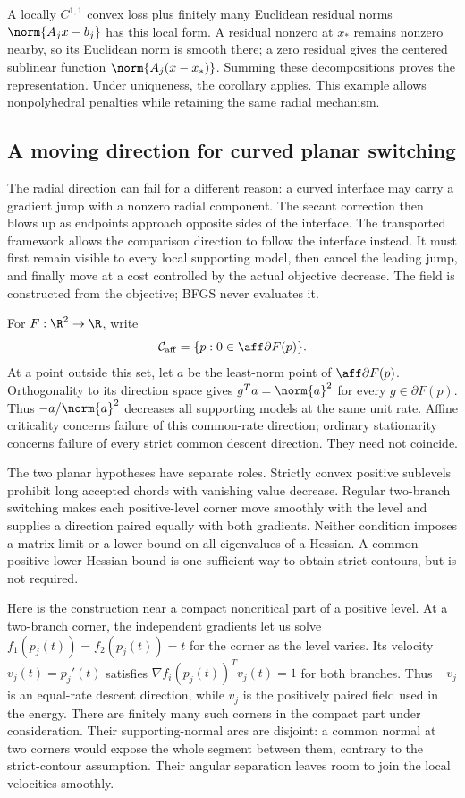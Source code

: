 A locally $C^{1,1}$ convex loss plus finitely many Euclidean
residual norms $\norm{A_jx-b_j}$ has this local form. A residual nonzero at
$x_*$ remains nonzero nearby, so its Euclidean norm is smooth there; a zero
residual gives the centered sublinear function $\norm{A_j(x-x_*)}$.
Summing these decompositions proves the representation. Under uniqueness,
the corollary applies. This example allows nonpolyhedral penalties while
retaining the same radial mechanism.

\subsection{A moving direction for curved planar switching}

The radial direction can fail for a different reason: a curved interface may
carry a gradient jump with a nonzero radial component. The secant correction
then blows up as endpoints approach opposite sides of the interface.
The transported framework allows the comparison direction to follow the
interface instead. It must first remain visible to every local supporting
model, then cancel the leading jump, and finally move at a cost controlled
by the actual objective decrease. The field is constructed from the
objective; BFGS never evaluates it.

For $F:\R^2\to\R$, write
\[
 \mathcal C_{\rm aff}=
 \{p:0\in\aff\partial F(p)\}.
\]
At a point outside this set, let $a$ be the least-norm point of
$\aff\partial F(p)$. Orthogonality to its direction space gives
$g^Ta=\norm{a}^2$ for every $g\in\partial F(p)$. Thus
$-a/\norm{a}^2$ decreases all supporting models at the same unit rate.
Affine criticality concerns failure of this common-rate direction;
ordinary stationarity concerns failure of every strict common descent
direction. They need not coincide.

The two planar hypotheses have separate roles. Strictly convex positive
sublevels prohibit long accepted chords with vanishing value decrease.
Regular two-branch switching makes each positive-level corner move smoothly
with the level and supplies a direction paired equally with both gradients.
Neither condition imposes a matrix limit or a lower bound on all eigenvalues
of a Hessian. A common positive lower Hessian bound is one sufficient way
to obtain strict contours, but is not required.

Here is the construction near a compact noncritical part of a positive
level. At a two-branch corner, the independent gradients let us solve
$f_1(p_j(t))=f_2(p_j(t))=t$ for the corner as the level varies.
Its velocity $v_j(t)=p_j'(t)$ satisfies
$\nabla f_i(p_j(t))^Tv_j(t)=1$ for both branches. Thus $-v_j$ is an
equal-rate descent direction, while $v_j$ is the positively paired field
used in the energy. There are finitely many such corners in the compact
part under consideration. Their supporting-normal arcs are disjoint: a common normal at two
corners would expose the whole segment between them, contrary to the
strict-contour assumption. Their angular separation leaves room to join
the local velocities smoothly.

